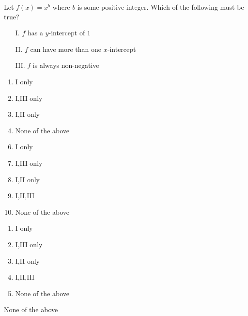 


 Let $f(x)=x^{b}$ where $b$ is some positive integer.  Which of the following must be true? 
\begin{enumerate}[label=\Roman*.]
\item [I.] $f$ has a $y$-intercept of $1$
\item[II.] $f$ can have more than one $x$-intercept
\item[III.] $f$ is always non-negative
\end{enumerate}



\ifsat
	\begin{enumerate}[label=\Alph*)]
		\item   I only
		\item  I,III only
		\item  I,II only
		\item  None of the above%
	\end{enumerate}
\else
\fi

\ifacteven
	\begin{enumerate}[label=\textbf{\Alph*.},itemsep=\fill,align=left]
		\setcounter{enumii}{5}
		\item   I only
		\item  I,III only
		\item  I,II only
		\addtocounter{enumii}{1}
		\item  I,II,III 
		\item  None of the above%
	\end{enumerate}
\else
\fi

\ifactodd
	\begin{enumerate}[label=\textbf{\Alph*.},itemsep=\fill,align=left]
		\item   I only
		\item  I,III only
		\item  I,II only
		\item  I,II,III 
		\item  None of the above%
	\end{enumerate}
\else
\fi

\ifgridin
  None of the above%

\else
\fi

